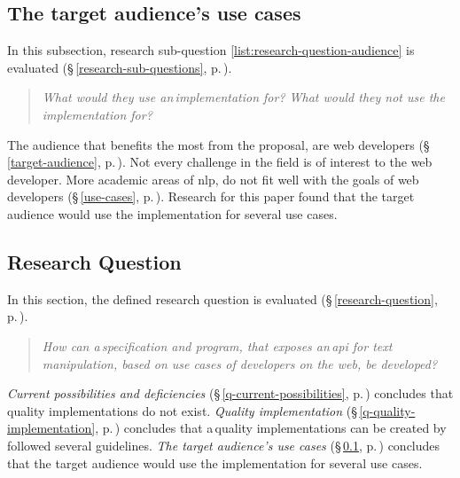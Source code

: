 \subsection{The target audience's use cases}\label{q-use-cases}

In this subsection, research sub-question
  \ref{list:research-question-audience} is evaluated
  (§\,\ref{research-sub-questions},
  p.\,\pageref{list:research-question-audience}).

\noindent\begin{quote}
  \textit{What would they use an\,implementation for? What would they
    \emph{not} use the implementation for?}
\end{quote}

The audience that benefits the most from the proposal, are web developers
  (§\,\ref{target-audience}, p.\,\pageref{target-audience}).
Not every challenge in the field is of interest to the web developer.
More academic areas of \gls{nlp}, do not fit well with the goals of web
  developers (§\,\ref{use-cases}, p.\,\pageref{use-cases}).
Research for this paper found that the target audience would use the
  implementation for several use cases.

\subsection{Research Question}\label{q-research-question}

In this section, the defined research question is evaluated
  (§\,\ref{research-question}, p.\,\pageref{research-question}).

\noindent\begin{quote}
  \textit{How can a\,specification and program, that exposes an\,\acrshort{api}
    for text manipulation, based on use cases of developers on the web,
    be developed?
  }
\end{quote}

\noindent\emph{Current possibilities and deficiencies}
  (§\,\ref{q-current-possibilities}, p.\,\pageref{q-current-possibilities})
  concludes that quality implementations do not exist.
\emph{Quality implementation} (§\,\ref{q-quality-implementation},
  p.\,\pageref{q-quality-implementation}) concludes that a\,quality
  implementations can be created by followed several guidelines.
\emph{The target audience's use cases} (§\,\ref{q-use-cases},
  p.\,\pageref{q-use-cases}) concludes that the target audience would use the
  implementation for several use cases.

